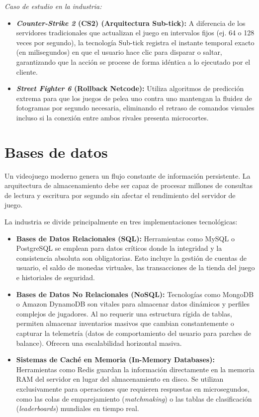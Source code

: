 \documentclass[12pt]{report}
\begin{document}
\textit{Caso de estudio en la industria:}
\begin{itemize}
    \item \textbf{\textit{Counter-Strike 2} (CS2) (Arquitectura Sub-tick):} A diferencia de los servidores tradicionales que actualizan el juego en intervalos fijos (ej. 64 o 128 veces por segundo), la tecnología Sub-tick registra el instante temporal exacto (en milisegundos) en que el usuario hace clic para disparar o saltar, garantizando que la acción se procese de forma idéntica a lo ejecutado por el cliente.
    \item \textbf{\textit{Street Fighter 6} (Rollback Netcode):} Utiliza algoritmos de predicción extrema para que los juegos de pelea uno contra uno mantengan la fluidez de fotogramas por segundo necesaria, eliminando el retraso de comandos visuales incluso si la conexión entre ambos rivales presenta microcortes.
\end{itemize}

\section{Bases de datos}

Un videojuego moderno genera un flujo constante de información persistente. La arquitectura de almacenamiento debe ser capaz de procesar millones de consultas de lectura y escritura por segundo sin afectar el rendimiento del servidor de juego.

La industria se divide principalmente en tres implementaciones tecnológicas:

\begin{itemize}
    \item \textbf{Bases de Datos Relacionales (SQL):} Herramientas como MySQL o PostgreSQL se emplean para datos críticos donde la integridad y la consistencia absoluta son obligatorias. Esto incluye la gestión de cuentas de usuario, el saldo de monedas virtuales, las transacciones de la tienda del juego e historiales de seguridad.
    \item \textbf{Bases de Datos No Relacionales (NoSQL):} Tecnologías como MongoDB o Amazon DynamoDB son vitales para almacenar datos dinámicos y perfiles complejos de jugadores. Al no requerir una estructura rígida de tablas, permiten almacenar inventarios masivos que cambian constantemente o capturar la telemetría (datos de comportamiento del usuario para parches de balance). Ofrecen una escalabilidad horizontal masiva.
    \item \textbf{Sistemas de Caché en Memoria (In-Memory Databases):} Herramientas como Redis guardan la información directamente en la memoria RAM del servidor en lugar del almacenamiento en disco. Se utilizan exclusivamente para operaciones que requieren respuestas en microsegundos, como las colas de emparejamiento (\textit{matchmaking}) o las tablas de clasificación (\textit{leaderboards}) mundiales en tiempo real.
\end{itemize}
\end{document}
